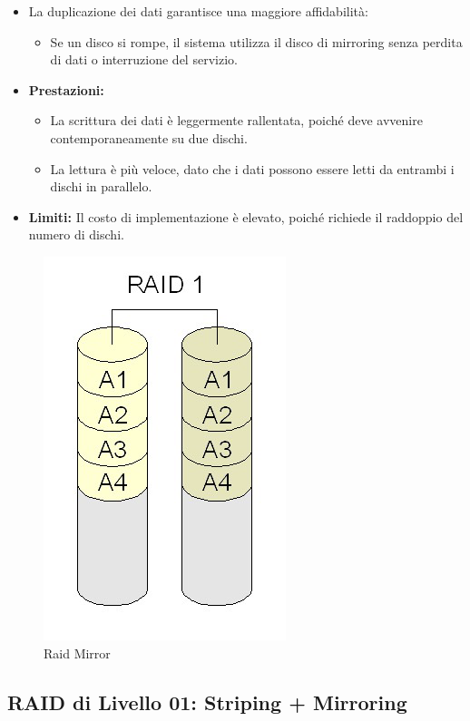 \begin{itemize}
    \item La duplicazione dei dati garantisce una maggiore affidabilità:
    \begin{itemize}
        \item Se un disco si rompe, il sistema utilizza il disco di mirroring senza perdita di dati o interruzione del servizio.
    \end{itemize}
    \item \textbf{Prestazioni:} 
    \begin{itemize}
        \item La scrittura dei dati è leggermente rallentata, poiché deve avvenire contemporaneamente su due dischi.
        \item La lettura è più veloce, dato che i dati possono essere letti da entrambi i dischi in parallelo.
    \end{itemize}
    \item \textbf{Limiti:} Il costo di implementazione è elevato, poiché richiede il raddoppio del numero di dischi.
\end{itemize}

\begin{figure}[h] \centering \includegraphics[width=0.20\linewidth]{images/raid_mirro1.png} \caption{Raid Mirror} \end{figure}


\subsection{RAID di Livello 01: Striping + Mirroring}


